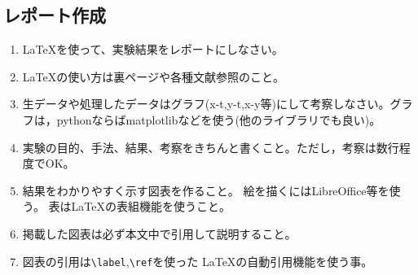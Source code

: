 \documentclass{jsarticle}
\begin{document}
\subsection{レポート作成}
\begin{enumerate}
\item \LaTeX を使って、実験結果をレポートにしなさい。
\item \LaTeX の使い方は裏ページや各種文献参照のこと。
\item  生データや処理したデータはグラフ(x-t,y-t,x-y等)にして考察しなさい。グラフは，pythonならばmatplotlibなどを使う(他のライブラリでも良い)。
\item 実験の目的、手法、結果、考察をきちんと書くこと。ただし，考察は数行程度でOK。
\item 結果をわかりやすく示す図表を作ること。
  絵を描くにはLibreOffice等を使う。
  表は\LaTeX の表組機能を使うこと。
\item 掲載した図表は必ず本文中で引用して説明すること。
\item 図表の引用は\verb|\label|,\verb|\ref|を使った
  \LaTeX の自動引用機能を使う事。
\end{enumerate}
\end{document}
